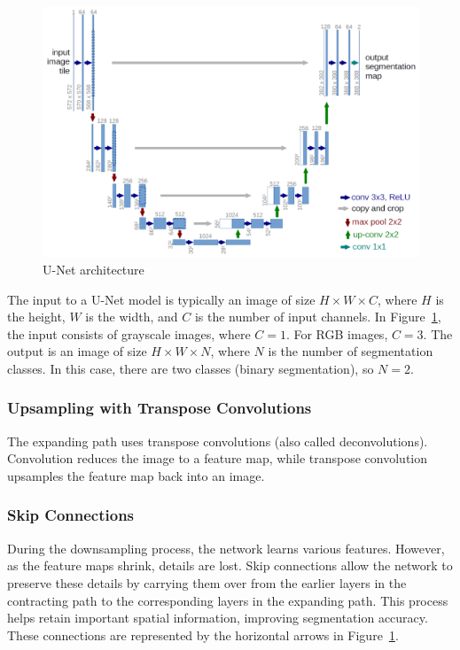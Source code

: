 \begin{figure}[H]
    \centering
    \includegraphics[width=0.8\linewidth]{PICTURES/unet-architecture.png}
    \caption{U-Net architecture \cite{ronneberger_u-net_2015}}
    \label{fig:unet-architecture}
\end{figure}

The input to a U-Net model is typically an image of size $H \times W \times C$, where $H$ is the height, $W$ is the width, and $C$ is the number of input channels. In Figure~\ref{fig:unet-architecture}, the input consists of grayscale images, where $C = 1$. For RGB images, $C = 3$. The output is an image of size $H \times W \times N$, where $N$ is the number of segmentation classes. In this case, there are two classes (binary segmentation), so $N = 2$.

\subsubsection{Upsampling with Transpose Convolutions}

The expanding path uses transpose convolutions (also called deconvolutions). Convolution reduces the image to a feature map, while transpose convolution upsamples the feature map back into an image.

\subsubsection{Skip Connections}

During the downsampling process, the network learns various features. However, as the feature maps shrink, details are lost. Skip connections allow the network to preserve these details by carrying them over from the earlier layers in the contracting path to the corresponding layers in the expanding path. This process helps retain important spatial information, improving segmentation accuracy. These connections are represented by the horizontal arrows in Figure~\ref{fig:unet-architecture}.
